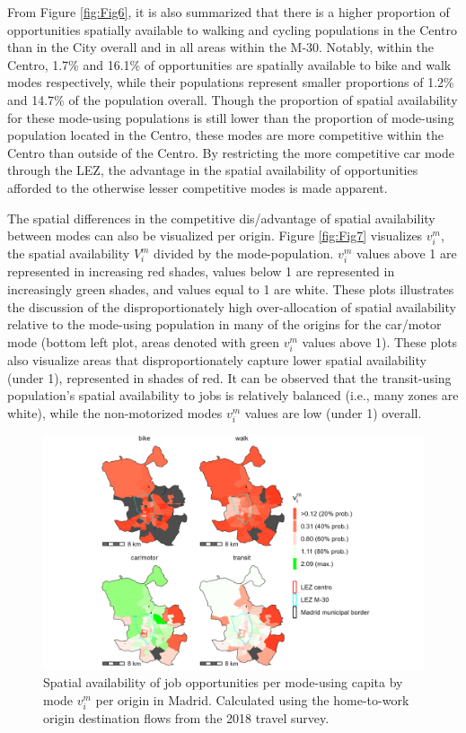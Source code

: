 \documentclass[10pt,letterpaper]{article}
\begin{document}
From Figure \ref{fig:Fig6}, it is also summarized that there is a higher
proportion of opportunities spatially available to walking and cycling
populations in the Centro than in the City overall and in all areas
within the M-30. Notably, within the Centro, 1.7\% and 16.1\% of
opportunities are spatially available to bike and walk modes
respectively, while their populations represent smaller proportions of
1.2\% and 14.7\% of the population overall. Though the proportion of
spatial availability for these mode-using populations is still lower
than the proportion of mode-using population located in the Centro,
these modes are more competitive within the Centro than outside of the
Centro. By restricting the more competitive car mode through the LEZ,
the advantage in the spatial availability of opportunities afforded to
the otherwise lesser competitive modes is made apparent.

The spatial differences in the competitive dis/advantage of spatial
availability between modes can also be visualized per origin. Figure
\ref{fig:Fig7} visualizes \(v_i^m\), the spatial availability \(V_i^m\)
divided by the mode-population. \(v_i^m\) values above 1 are represented
in increasing red shades, values below 1 are represented in increasingly
green shades, and values equal to 1 are white. These plots illustrates
the discussion of the disproportionately high over-allocation of spatial
availability relative to the mode-using population in many of the
origins for the car/motor mode (bottom left plot, areas denoted with
green \(v_i^m\) values above 1). These plots also visualize areas that
disproportionately capture lower spatial availability (under 1),
represented in shades of red. It can be observed that the transit-using
population's spatial availability to jobs is relatively balanced (i.e.,
many zones are white), while the non-motorized modes \(v_i^m\) values
are low (under 1) overall.

\begin{figure}

{\centering \includegraphics[width=1\linewidth]{images/SA_im_vv_zn208_plot} 

}

\caption{\label{fig:Fig7} Spatial availability of job opportunities per mode-using capita by mode $v_i^m$ per origin in Madrid. Calculated using the home-to-work origin destination flows from the 2018 travel survey.}\label{fig:SA-per-capita-m-plot}
\end{figure}
\end{document}

